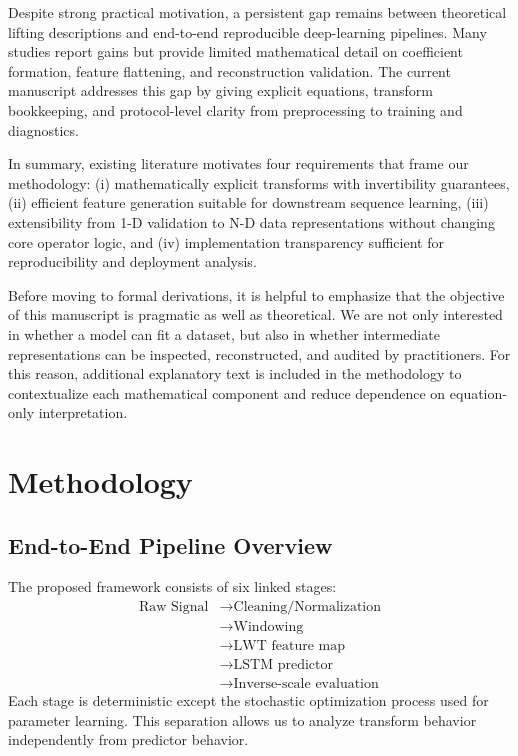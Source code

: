 \documentclass[journal]{IEEEtran}
\begin{document}
Despite strong practical motivation, a persistent gap remains between theoretical lifting descriptions and end-to-end reproducible deep-learning pipelines. Many studies report gains but provide limited mathematical detail on coefficient formation, feature flattening, and reconstruction validation. The current manuscript addresses this gap by giving explicit equations, transform bookkeeping, and protocol-level clarity from preprocessing to training and diagnostics.

In summary, existing literature motivates four requirements that frame our methodology: (i) mathematically explicit transforms with invertibility guarantees, (ii) efficient feature generation suitable for downstream sequence learning, (iii) extensibility from 1-D validation to N-D data representations without changing core operator logic, and (iv) implementation transparency sufficient for reproducibility and deployment analysis.

Before moving to formal derivations, it is helpful to emphasize that the objective of this manuscript is pragmatic as well as theoretical. We are not only interested in whether a model can fit a dataset, but also in whether intermediate representations can be inspected, reconstructed, and audited by practitioners. For this reason, additional explanatory text is included in the methodology to contextualize each mathematical component and reduce dependence on equation-only interpretation.

\section{Methodology}
\subsection{End-to-End Pipeline Overview}
The proposed framework consists of six linked stages:
\begin{equation}
\begin{aligned}
\text{Raw Signal} &\rightarrow \text{Cleaning/Normalization} \\
&\rightarrow \text{Windowing} \\
&\rightarrow \text{LWT feature map} \\
&\rightarrow \text{LSTM predictor} \\
&\rightarrow \text{Inverse-scale evaluation}
\end{aligned}
\end{equation}
Each stage is deterministic except the stochastic optimization process used for parameter learning. This separation allows us to analyze transform behavior independently from predictor behavior.
\end{document}
